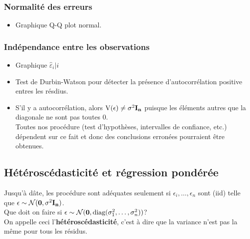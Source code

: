 \documentclass[10pt, french]{article}
\begin{document}
\begin{multicols*}{3}
\subsubsection*{Normalité des erreurs}

\begin{itemize}
\item Graphique Q-Q plot normal.
\end{itemize}

\subsubsection*{Indépendance entre les observations}
\begin{itemize}
\item Graphique $\hat{\varepsilon}_i | i$
\item Test de Durbin-Watson pour détecter la présence d'autocorrélation positive entres les résdius.
\item S'il y a autocorrélation, alors $\text{V}(\epsilon) \not= \sigma^{2} \mathbf{I_n}$ puisque les éléments autres que la diagonale ne sont pas toutes 0. \\
Toutes nos procédure (test d'hypothèses, intervalles de confiance, etc.) dépendent sur ce fait et donc des conclusions erronées pourraient être obtenues.
\end{itemize}

\subsection*{Hétéroscédasticité et régression pondérée}

Jusqu'à dâte, les procédure sont adéquates seulement si $\epsilon_i, \dots, \epsilon_n$ sont (iid) telle que $\epsilon \sim \mathcal{N}(\mathbf{0}, \sigma^{2}\mathbf{I_n})$.\\
Que doit on faire si $\epsilon \sim \mathcal{N}(\mathbf{0}, 
\text{diag}(\sigma^{2}_{1}, \dots, \sigma^{2}_{n}))$?\\
On appelle ceci l'\textbf{hétéroscédasticité}, c'est à dire que la variance n'est pas la même pour tous les résidus.



\end{multicols*}
\end{document}

